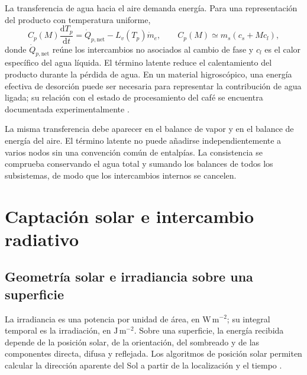 La transferencia de agua hacia el aire demanda energía. Para una representación del producto con temperatura uniforme,
\begin{equation}
C_p(M)\frac{\mathrm{d}T_p}{\mathrm{d}t}
=\dot Q_{p,\mathrm{net}}-L_v(T_p)\dot m_e,
\qquad
C_p(M)\simeq m_s(c_s+Mc_l),
\label{eq:energia_producto}
\end{equation}
donde $\dot Q_{p,\mathrm{net}}$ reúne los intercambios no asociados al cambio de fase y $c_l$ es el calor específico del agua líquida. El término latente reduce el calentamiento del producto durante la pérdida de agua. En un material higroscópico, una energía efectiva de desorción puede ser necesaria para representar la contribución de agua ligada; su relación con el estado de procesamiento del café se encuentra documentada experimentalmente \cite{correa2010}.

La misma transferencia debe aparecer en el balance de vapor y en el balance de energía del aire. El término latente no puede añadirse independientemente a varios nodos sin una convención común de entalpías. La consistencia se comprueba conservando el agua total y sumando los balances de todos los subsistemas, de modo que los intercambios internos se cancelen.

\section{Captación solar e intercambio radiativo}
\label{sec:radiacion_solar}

\subsection{Geometría solar e irradiancia sobre una superficie}

La irradiancia es una potencia por unidad de área, en $\mathrm{W\,m^{-2}}$; su integral temporal es la irradiación, en $\mathrm{J\,m^{-2}}$. Sobre una superficie, la energía recibida depende de la posición solar, de la orientación, del sombreado y de las componentes directa, difusa y reflejada. Los algoritmos de posición solar permiten calcular la dirección aparente del Sol a partir de la localización y el tiempo \cite{reda2004}.

